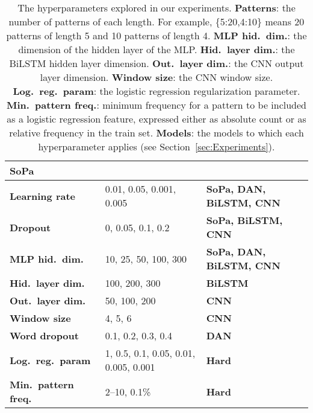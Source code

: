 \documentclass[11pt,a4paper]{article}
\newcommand{\secref}[1]{Section~\ref{sec:#1}}
\newcommand{\SoftP}{SoPa\xspace}
\begin{document}
\begin{appendices}
\begin{table}[t]
\begin{tabularx}{\linewidth}{@{}l X X@{}}
   {\bf \SoftP} \\ 
 \midrule[\cmidrulewidth]
{\bf Learning rate} & 0.01, 0.05, 0.001, 0.005 & {\bf \SoftP, DAN, BiLSTM, CNN} \\ 
 \midrule[\cmidrulewidth]
{\bf Dropout} & 0, 0.05, 0.1, 0.2 & {\bf \SoftP, BiLSTM, CNN} \\ 
 \midrule[\cmidrulewidth]
{\bf MLP hid.~dim.} & 10, 25, 50, 100, 300 &  {\bf \SoftP, DAN, BiLSTM, CNN} \\ 
 \midrule[\cmidrulewidth]
{\bf Hid.~layer dim.} & 100, 200, 300&  {\bf BiLSTM} \\ 
 \midrule[\cmidrulewidth]
{\bf Out.~layer dim.} & 50, 100, 200&  {\bf CNN} \\ 
 \midrule[\cmidrulewidth]
{\bf Window size} & 4, 5, 6&  {\bf CNN} \\ 
 \midrule[\cmidrulewidth]
{\bf Word dropout} & 0.1, 0.2, 0.3, 0.4 &  {\bf DAN} \\ 
 \midrule[\cmidrulewidth]
{\bf Log.~reg.~param} &  1, 0.5, 0.1, 0.05, 0.01, 0.005, 0.001 &  {\bf Hard} \\ 
 \midrule[\cmidrulewidth]
{\bf Min.~pattern freq.} &  2--10, 0.1\% &  {\bf Hard} \\
  \bottomrule
\end{tabularx}
\caption{\label{Hyperparameters} 
The hyperparameters explored in our experiments.
{\bf Patterns}: the number of patterns of each length.
For example, \{5:20,4:10\} means 20 patterns of length 5 and 10 patterns of length 4.
{\bf MLP hid.~dim.}: the dimension of the hidden layer of the MLP.
{\bf Hid.~layer dim.}: the BiLSTM hidden layer dimension.
{\bf Out.~layer dim.}: the CNN output layer dimension.
{\bf Window size}: the CNN window size.
{\bf Log.~reg.~param}: the logistic regression regularization parameter.
{\bf Min.~pattern freq.}: minimum frequency for a pattern to be included as a logistic regression feature, expressed either as absolute count or as relative frequency in the train set.
{\bf Models}: the models to which each hyperparameter applies (see \secref{Experiments}).
}
\end{table}



\end{appendices}
\end{document}
